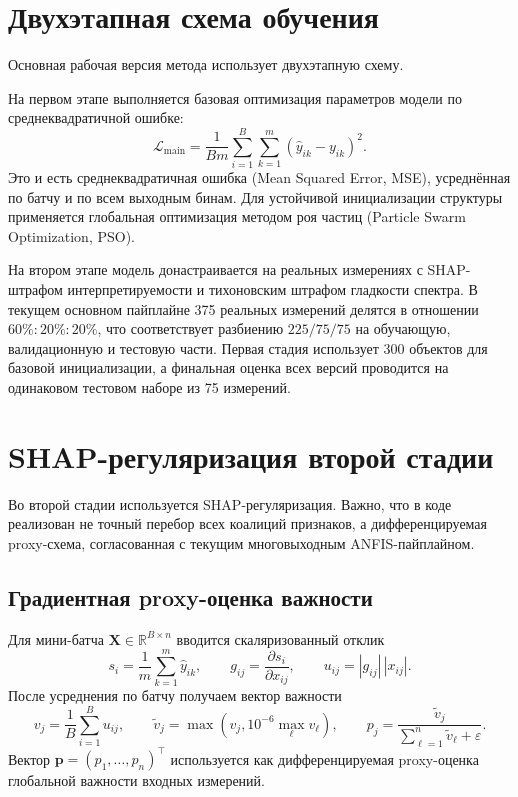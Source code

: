 \section{Двухэтапная схема обучения}

Основная рабочая версия метода использует двухэтапную схему.

На первом этапе выполняется базовая оптимизация параметров модели по среднеквадратичной ошибке:
\begin{equation}
\mathcal{L}_{\mathrm{main}} = \frac{1}{Bm} \sum_{i=1}^{B} \sum_{k=1}^{m} (\hat{y}_{ik} - y_{ik})^2.
\end{equation}
Это и есть среднеквадратичная ошибка (Mean Squared Error, MSE), усреднённая по батчу и по всем выходным бинам. Для устойчивой инициализации структуры применяется глобальная оптимизация методом роя частиц (Particle Swarm Optimization, PSO).

На втором этапе модель донастраивается на реальных измерениях с SHAP-штрафом интерпретируемости и тихоновским штрафом гладкости спектра. В текущем основном пайплайне 375 реальных измерений делятся в отношении $60\%:20\%:20\%$, что соответствует разбиению $225/75/75$ на обучающую, валидационную и тестовую части. Первая стадия использует 300 объектов для базовой инициализации, а финальная оценка всех версий проводится на одинаковом тестовом наборе из 75 измерений.

\section{SHAP-регуляризация второй стадии}

Во второй стадии используется SHAP-регуляризация. Важно, что в коде реализован не точный перебор всех коалиций признаков, а дифференцируемая proxy-схема, согласованная с текущим многовыходным ANFIS-пайплайном.

\subsection{Градиентная proxy-оценка важности}

Для мини-батча $\mathbf{X} \in \mathbb{R}^{B \times n}$ вводится скаляризованный отклик
\begin{equation}
s_i = \frac{1}{m}\sum_{k=1}^{m} \hat{y}_{ik},
\qquad
 g_{ij} = \frac{\partial s_i}{\partial x_{ij}},
\qquad
u_{ij} = |g_{ij}|\,|x_{ij}|.
\end{equation}
После усреднения по батчу получаем вектор важности
\begin{equation}
v_j = \frac{1}{B}\sum_{i=1}^{B} u_{ij},
\qquad
\tilde{v}_j = \max\!\left(v_j, 10^{-6}\max_{\ell} v_{\ell}\right),
\qquad
p_j = \frac{\tilde{v}_j}{\sum_{\ell=1}^{n} \tilde{v}_{\ell} + \varepsilon}.
\end{equation}
Вектор $\mathbf{p} = (p_1,\dots,p_n)^\top$ используется как дифференцируемая proxy-оценка глобальной важности входных измерений.

